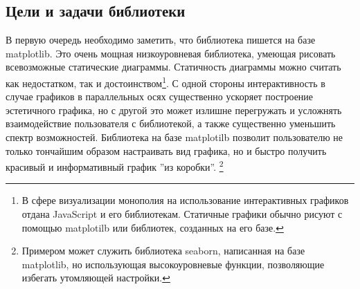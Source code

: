 \documentclass[12pt,fleqn]{article}
\begin{document}
\subsection{Цели и задачи библиотеки}
В первую очередь необходимо заметить, что библиотека пишется на базе 
matplotlib. Это очень мощная низкоуровневая библиотека, умеющая рисовать всевозможные 
статические диаграммы. Статичность диаграммы можно считать как недостатком, так и достоинством\footnote{
    В сфере визуализации монополия на использование интерактивных графиков отдана JavaScript и
его библиотекам. Статичные графики обычно рисуют с помощью matplotilb или библиотек, созданных на его базе.}. 
С одной стороны интерактивность в случае графиков в параллельных осях существенно ускоряет построение
эстетичного графика, но с другой это может излишне перегружать и усложнять взаимодействие
пользователя с библиотекой, а также существенно уменьшить спектр возможностей. Библиотека на базе 
matplotilb позволит пользователю не только тончайшим образом настраивать вид графика, но и быстро
получить красивый и информативный график ''из коробки''.
\footnote{Примером может служить библиотека seaborn, написанная на базе matplotlib, но
использующая высокоуровневые функции, позволяющие избегать утомляющей настройки.}
\end{document}
